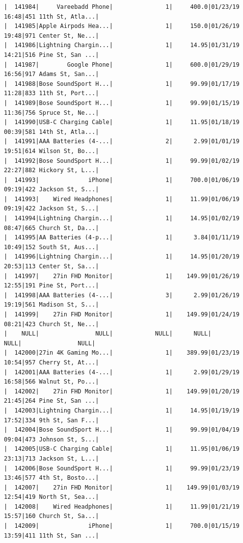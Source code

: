 \documentclass[
  letterpaper,
  DIV=11,
  numbers=noendperiod]{scrartcl}
\begin{document}
\begin{verbatim}
|  141984|     Vareebadd Phone|               1|     400.0|01/23/19 16:48|451 11th St, Atla...|
|  141985|Apple Airpods Hea...|               1|     150.0|01/26/19 19:48|971 Center St, Ne...|
|  141986|Lightning Chargin...|               1|     14.95|01/31/19 14:21|516 Pine St, San ...|
|  141987|        Google Phone|               1|     600.0|01/29/19 16:56|917 Adams St, San...|
|  141988|Bose SoundSport H...|               1|     99.99|01/17/19 11:28|833 11th St, Port...|
|  141989|Bose SoundSport H...|               1|     99.99|01/15/19 11:36|756 Spruce St, Ne...|
|  141990|USB-C Charging Cable|               1|     11.95|01/18/19 00:39|581 14th St, Atla...|
|  141991|AAA Batteries (4-...|               2|      2.99|01/01/19 19:51|614 Wilson St, Bo...|
|  141992|Bose SoundSport H...|               1|     99.99|01/02/19 22:27|882 Hickory St, L...|
|  141993|              iPhone|               1|     700.0|01/06/19 09:19|422 Jackson St, S...|
|  141993|    Wired Headphones|               1|     11.99|01/06/19 09:19|422 Jackson St, S...|
|  141994|Lightning Chargin...|               1|     14.95|01/02/19 08:47|665 Church St, Da...|
|  141995|AA Batteries (4-p...|               1|      3.84|01/11/19 10:49|152 South St, Aus...|
|  141996|Lightning Chargin...|               1|     14.95|01/20/19 20:53|113 Center St, Sa...|
|  141997|    27in FHD Monitor|               1|    149.99|01/26/19 12:55|191 Pine St, Port...|
|  141998|AAA Batteries (4-...|               3|      2.99|01/26/19 19:19|561 Madison St, S...|
|  141999|    27in FHD Monitor|               1|    149.99|01/24/19 08:21|423 Church St, Ne...|
|    NULL|                NULL|            NULL|      NULL|          NULL|                NULL|
|  142000|27in 4K Gaming Mo...|               1|    389.99|01/23/19 10:54|957 Cherry St, At...|
|  142001|AAA Batteries (4-...|               1|      2.99|01/29/19 16:58|566 Walnut St, Po...|
|  142002|    27in FHD Monitor|               1|    149.99|01/20/19 21:45|264 Pine St, San ...|
|  142003|Lightning Chargin...|               1|     14.95|01/19/19 17:52|334 9th St, San F...|
|  142004|Bose SoundSport H...|               1|     99.99|01/04/19 09:04|473 Johnson St, S...|
|  142005|USB-C Charging Cable|               1|     11.95|01/06/19 23:13|713 Jackson St, L...|
|  142006|Bose SoundSport H...|               1|     99.99|01/23/19 13:46|577 4th St, Bosto...|
|  142007|    27in FHD Monitor|               1|    149.99|01/03/19 12:54|419 North St, Sea...|
|  142008|    Wired Headphones|               1|     11.99|01/21/19 15:57|160 Church St, Sa...|
|  142009|              iPhone|               1|     700.0|01/15/19 13:59|411 11th St, San ...|

\end{verbatim}
\end{document}
